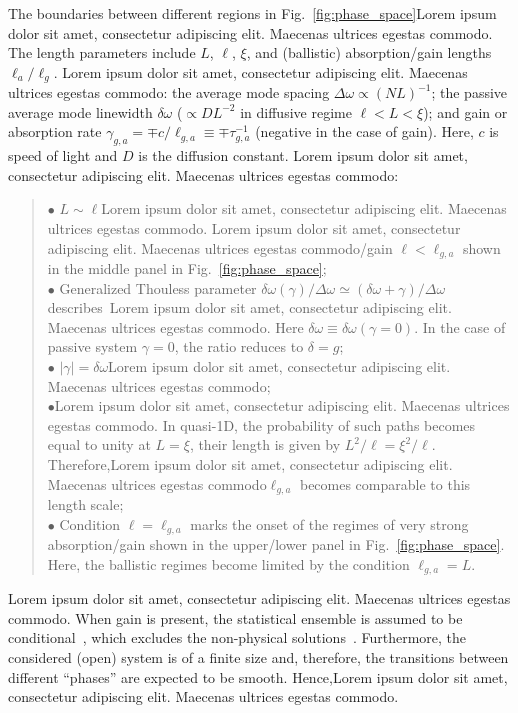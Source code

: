 The boundaries between different regions in Fig.~\ref{fig:phase_space}Lorem ipsum dolor sit amet, consectetur adipiscing elit. Maecenas ultrices egestas commodo. The length parameters include $L$, $\ell$, $\xi$, and (ballistic) absorption/gain lengths $\ell_a/\ell_g$. Lorem ipsum dolor sit amet, consectetur adipiscing elit. Maecenas ultrices egestas commodo: the average mode spacing $\Delta\omega\propto (NL)^{-1}$; the passive average mode linewidth $\delta\omega$ ($\propto DL^{-2}$ in diffusive regime $\ell<L<\xi$); and gain or absorption rate $\gamma_{g,a}=\mp c/\ell_{g,a}\equiv\mp\tau_{g,a}^{-1}$ (negative in the case of gain). Here, $c$ is speed of light and $D$ is the diffusion constant. Lorem ipsum dolor sit amet, consectetur adipiscing elit. Maecenas ultrices egestas commodo:
\begin{quote}
$\bullet$ $L\sim\ell$Lorem ipsum dolor sit amet, consectetur adipiscing elit. Maecenas ultrices egestas commodo. Lorem ipsum dolor sit amet, consectetur adipiscing elit. Maecenas ultrices egestas commodo/gain $\ell<\ell_{g,a}$ shown in the middle panel in Fig.~\ref{fig:phase_space};\\
$\bullet$ Generalized Thouless parameter $\delta\omega(\gamma)/\Delta\omega\simeq(\delta\omega+\gamma)/\Delta\omega$ describes~\cite{2005_Yamilov_correlations}Lorem ipsum dolor sit amet, consectetur adipiscing elit. Maecenas ultrices egestas commodo. Here $\delta\omega\equiv\delta\omega(\gamma=0)$. In the case of passive system $\gamma=0$, the ratio reduces to $\delta=g$;\\
$\bullet$ $|\gamma|=\delta\omega$Lorem ipsum dolor sit amet, consectetur adipiscing elit. Maecenas ultrices egestas commodo;\\
$\bullet$Lorem ipsum dolor sit amet, consectetur adipiscing elit. Maecenas ultrices egestas commodo. In quasi-1D, the probability of such paths becomes equal to unity at $L=\xi$, their length is given by $L^2/\ell=\xi^2/\ell$. Therefore,Lorem ipsum dolor sit amet, consectetur adipiscing elit. Maecenas ultrices egestas commodo$\ell_{g,a}$ becomes comparable to this length scale;\\
$\bullet$ Condition $\ell=\ell_{g,a}$ marks the onset of the regimes of very strong absorption/gain shown in the upper/lower panel in Fig.~\ref{fig:phase_space}. Here, the ballistic regimes become limited by the condition $\ell_{g,a}=L$.\\
\end{quote}
Lorem ipsum dolor sit amet, consectetur adipiscing elit. Maecenas ultrices egestas commodo. When gain is present, the statistical ensemble is assumed to be conditional~\cite{2005_Yamilov_correlations}, which excludes the non-physical solutions~\cite{2002_Zhang_phys_solutions}. Furthermore, the considered (open) system is of a finite size and, therefore, the transitions between different ``phases'' are expected to be smooth. Hence,Lorem ipsum dolor sit amet, consectetur adipiscing elit. Maecenas ultrices egestas commodo.


